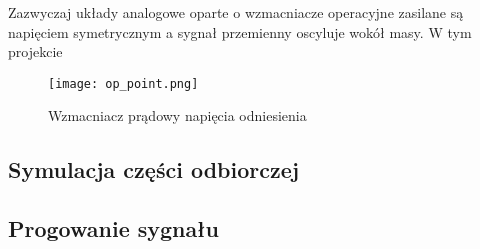 Zazwyczaj układy analogowe oparte o wzmacniacze operacyjne zasilane są napięciem symetrycznym a sygnał przemienny oscyluje wokół masy. 
W tym projekcie 
\begin{figure}[ht!]
    \centering
    \texttt{[image: op\_point.png]}
    \caption{Wzmacniacz prądowy napięcia odniesienia}
\end{figure}



\subsection{Symulacja części odbiorczej}
\begin{figure}[ht!]
    \centering
\end{figure}

\subsection{Progowanie sygnału}
\begin{figure}[ht!]
    \centering
\end{figure}


